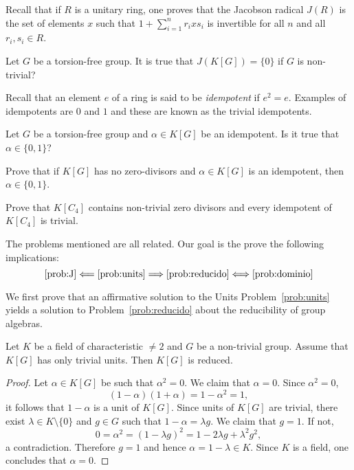 Recall that if $R$ is a unitary ring, one proves that 
the Jacobson radical $J(R)$ is 
the set of elements $x$ such that
$1+\sum_{i=1}^n r_ixs_i$ is invertible 
for all $n$ and all $r_i,s_i\in R$.


\begin{problem}[Semisimplicity]
	\label{prob:J}
	Let $G$ be a torsion-free group. It is true that 
	$J(K[G])=\{0\}$ if $G$ is non-trivial?
\end{problem}

Recall that an element $e$ of a ring is said to be \emph{idempotent} 
if $e^2=e$. Examples of idempotents are $0$ and $1$ and 
these are known as the trivial idempotents. 

\begin{problem}[Idempotents]
	\label{pro:idempotente}
	Let $G$ be a torsion-free group and $\alpha\in K[G]$ be an idempotent. 
	Is it true that $\alpha\in\{0,1\}$?
\end{problem}

\begin{exercise}
	Prove that if $K[G]$ has no zero-divisors and $\alpha\in K[G]$ is an
	idempotent, then $\alpha\in\{0,1\}$.
\end{exercise}

\begin{exercise}
	Prove that $K[C_4]$ contains non-trivial zero divisors and every
	idempotent of $K[C_4]$ is trivial. 
\end{exercise}

The problems mentioned are all related. Our goal is the prove
the following implications:
\[
	\ref{prob:J}\Longleftarrow\ref{prob:units}\Longrightarrow\ref{prob:reducido}\Longleftrightarrow\ref{prob:dominio}
\]

We first prove that an affirmative solution to the Units
Problem~\ref{prob:units} yields a solution to Problem~\ref{prob:reducido}
about the reducibility of group algebras.

\begin{theorem}
    Let $K$ be a field of characteristic $\ne2$ 
	and $G$ be a non-trivial group. Assume that $K[G]$ has only trivial units.
	Then $K[G]$ is reduced. 
\end{theorem}

\begin{proof}
	Let $\alpha\in K[G]$ be such that $\alpha^2=0$. We claim that 
	$\alpha=0$. Since $\alpha^2=0$, 
	\[
		(1-\alpha)(1+\alpha)=1-\alpha^2=1, 
	\]
	it follows that $1-\alpha$ is a unit of $K[G]$. Since units of $K[G]$ are 
	trivial, there exist $\lambda\in K\setminus\{0\}$ and $g\in G$ such that 
	$1-\alpha=\lambda g$. We claim that $g=1$. If not, 
	\[
		0=\alpha^2=(1-\lambda g)^2=1-2\lambda g+\lambda^2g^2,
	\]
	a contradiction. Therefore $g=1$ and hence $\alpha=1-\lambda\in K$. Since
	$K$ is a field, one concludes that $\alpha=0$.
\end{proof}


